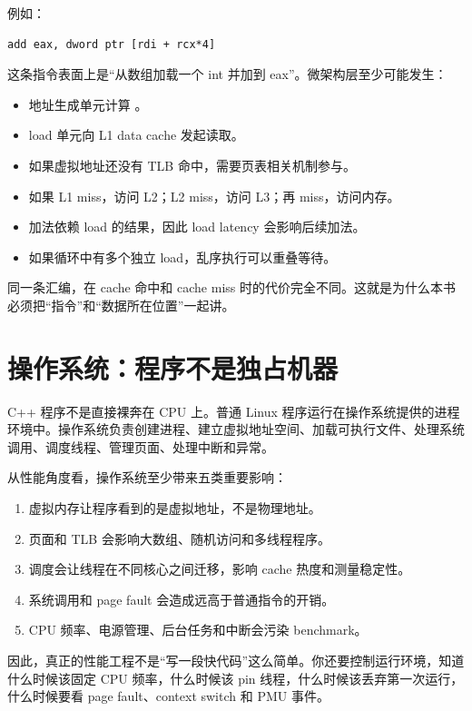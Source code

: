 例如：

\begin{lstlisting}
add eax, dword ptr [rdi + rcx*4]
\end{lstlisting}

这条指令表面上是“从数组加载一个 int 并加到 eax”。微架构层至少可能发生：

\begin{itemize}
  \item 地址生成单元计算 。
  \item load 单元向 L1 data cache 发起读取。
  \item 如果虚拟地址还没有 TLB 命中，需要页表相关机制参与。
  \item 如果 L1 miss，访问 L2；L2 miss，访问 L3；再 miss，访问内存。
  \item 加法依赖 load 的结果，因此 load latency 会影响后续加法。
  \item 如果循环中有多个独立 load，乱序执行可以重叠等待。
\end{itemize}

同一条汇编，在 cache 命中和 cache miss 时的代价完全不同。这就是为什么本书必须把“指令”和“数据所在位置”一起讲。

\section{操作系统：程序不是独占机器}

C++ 程序不是直接裸奔在 CPU 上。普通 Linux 程序运行在操作系统提供的进程环境中。操作系统负责创建进程、建立虚拟地址空间、加载可执行文件、处理系统调用、调度线程、管理页面、处理中断和异常。

从性能角度看，操作系统至少带来五类重要影响：

\begin{enumerate}
  \item 虚拟内存让程序看到的是虚拟地址，不是物理地址。
  \item 页面和 TLB 会影响大数组、随机访问和多线程程序。
  \item 调度会让线程在不同核心之间迁移，影响 cache 热度和测量稳定性。
  \item 系统调用和 page fault 会造成远高于普通指令的开销。
  \item CPU 频率、电源管理、后台任务和中断会污染 benchmark。
\end{enumerate}

因此，真正的性能工程不是“写一段快代码”这么简单。你还要控制运行环境，知道什么时候该固定 CPU 频率，什么时候该 pin 线程，什么时候该丢弃第一次运行，什么时候要看 page fault、context switch 和 PMU 事件。

